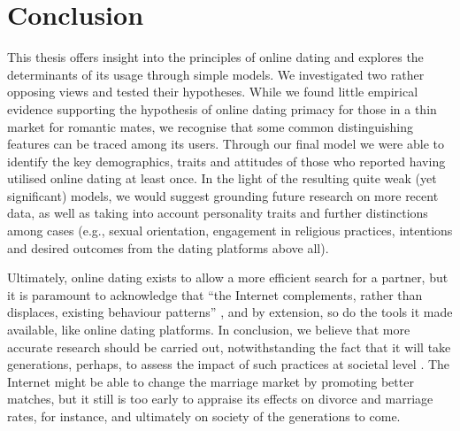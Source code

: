 
\lhead[\leftmark]{\leftmark}

\rhead[\leftmark]{}

\lfoot{}

\rfoot{}

\cfoot[\thepage]{\thepage}

\chapter{Conclusion}

This thesis offers insight into the principles of online dating and
explores the determinants of its usage through simple models. We investigated
two \textendash{} rather opposing \textendash{} views and tested their
hypotheses. While we found little empirical evidence supporting the
hypothesis of online dating primacy for those in a thin market for
romantic mates, we recognise that some common distinguishing features
can be traced among its users. Through our final model we were able
to identify the key demographics, traits and attitudes of those who
reported having utilised online dating at least once. In the light
of the resulting quite weak (yet significant) models, we would suggest
grounding future research on more recent data, as well as taking into
account personality traits and further distinctions among cases (e.g.,
sexual orientation, engagement in religious practices, intentions
and desired outcomes from the dating platforms above all).

Ultimately, online dating exists to allow a more efficient search
for a partner, but it is paramount to acknowledge that \textquotedblleft the
Internet complements, rather than displaces, existing behaviour patterns\textquotedblright{}
\citep{DiMaggio2001Social-Implicat}, and by extension, so do the
tools it made available, like online dating platforms. In conclusion,
we believe that more accurate research should be carried out, notwithstanding
the fact that it will take generations, perhaps, to assess the impact
of such practices at societal level \citep{Stevenson2007Marriage-and-Di}.
The Internet might be able to change the marriage market by promoting
better matches, but it still is too early to appraise its effects
on divorce and marriage rates, for instance, and ultimately on society
of the generations to come.


